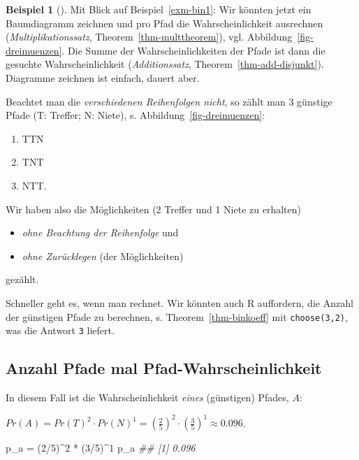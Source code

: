 \documentclass[
  ngerman,
  letterpaper,
  twoside,
  open=any]{scrbook}
\newenvironment{Shaded}{\begin{snugshade}}{\end{snugshade}}
\newcommand{\DecValTok}[1]{\textcolor[rgb]{0.68,0.00,0.00}{#1}}
\newcommand{\DocumentationTok}[1]{\textcolor[rgb]{0.37,0.37,0.37}{\textit{#1}}}
\newcommand{\NormalTok}[1]{\textcolor[rgb]{0.00,0.23,0.31}{#1}}
\newcommand{\OtherTok}[1]{\textcolor[rgb]{0.00,0.23,0.31}{#1}}
\newcommand{\SpecialCharTok}[1]{\textcolor[rgb]{0.37,0.37,0.37}{#1}}
\providecommand{\tightlist}{%
  \setlength{\itemsep}{0pt}\setlength{\parskip}{0pt}}\usepackage{longtable,booktabs,array}
\theoremstyle{definition}
\newtheorem{example}{Beispiel}[chapter]
\theoremstyle{plain}
\theoremstyle{definition}
\theoremstyle{definition}
\theoremstyle{remark}
\begin{document}
\begin{example}[]
Mit Blick auf Beispiel~\ref{exm-bin1}: Wir könnten jetzt ein
Baumdiagramm zeichnen und pro Pfad die Wahrscheinlichkeit ausrechnen
(\emph{Multiplikationssatz}, Theorem~\ref{thm-multtheorem}), vgl.
Abbildung~\ref{fig-dreimuenzen}. Die Summe der Wahrscheinlichkeiten der
Pfade ist dann die gesuchte Wahrscheinlichkeit (\emph{Additionssatz},
Theorem~\ref{thm-add-disjunkt}). Diagramme zeichnen ist einfach, dauert
aber.

Beachtet man die \emph{verschiedenen Reihenfolgen nicht}, so zählt man 3
günstige Pfade (T: Treffer; N: Niete), s.
Abbildung~\ref{fig-dreimuenzen}:

\begin{enumerate}
\def\labelenumi{\arabic{enumi}.}
\tightlist
\item
  TTN
\item
  TNT
\item
  NTT.
\end{enumerate}

Wir haben also die Möglichkeiten (2 Treffer und 1 Niete zu erhalten)

\begin{itemize}
\tightlist
\item
  \emph{ohne Beachtung der Reihenfolge} und
\item
  \emph{ohne Zurücklegen} (der Möglichkeiten)
\end{itemize}

gezählt.

Schneller geht es, wenn man rechnet. Wir könnten auch R auffordern, die
Anzahl der günstigen Pfade zu berechnen, s. Theorem~\ref{thm-binkoeff}
mit \texttt{choose(3,2)}, was die Antwort \texttt{3} liefert.

\subsection{Anzahl Pfade mal
Pfad-Wahrscheinlichkeit}\label{anzahl-pfade-mal-pfad-wahrscheinlichkeit}

In diesem Fall ist die Wahrscheinlichkeit \emph{eines} (günstigen)
Pfades, \(A\):

\(Pr(A) = Pr(T)^2 \cdot Pr(N)^1 = \left( \frac{2}{5} \right)^2 \cdot \left( \frac{3}{5} \right)^1 \approx 0.096\).

\begin{Shaded}
\begin{Highlighting}[]
\NormalTok{p\_a }\OtherTok{=}\NormalTok{ (}\DecValTok{2}\SpecialCharTok{/}\DecValTok{5}\NormalTok{)}\SpecialCharTok{\^{}}\DecValTok{2} \SpecialCharTok{*}\NormalTok{ (}\DecValTok{3}\SpecialCharTok{/}\DecValTok{5}\NormalTok{)}\SpecialCharTok{\^{}}\DecValTok{1}
\NormalTok{p\_a}
\DocumentationTok{\#\# [1] 0.096}
\end{Highlighting}
\end{Shaded}


\end{example}
\end{document}
